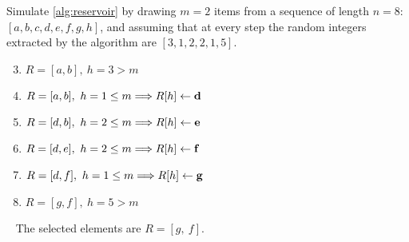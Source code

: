 \exercise

Simulate \autoref{alg:reservoir} by drawing $m = 2$ items from a sequence
of length $n = 8$: $[a, b, c, d, e, f, g, h]$, and assuming that at every step
the random integers extracted by the algorithm are $[3, 1, 2, 2, 1, 5]$.

\solution

\begin{enumerate}[\bf a.]
  \setcounter{enumi}{2}
  \item $R = [a, b],\ h = 3 > m$
  \item $R = [a, b],\ h = 1 \le m \Longrightarrow R[h] \gets \text{\bf d}$
  \item $R = [d, b],\ h = 2 \le m \Longrightarrow R[h] \gets \text{\bf e}$
  \item $R = [d, e],\ h = 2 \le m \Longrightarrow R[h] \gets \text{\bf f}$
  \item $R = [d, f],\ h = 1 \le m \Longrightarrow R[h] \gets \text{\bf g}$
  \item $R = [g, f],\ h = 5 > m$
\end{enumerate}\
%
The selected elements are $R = [ g,\ f ]$.

